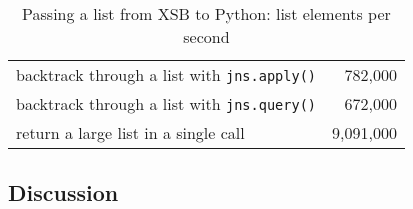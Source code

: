 \begin{table}[hbt] \label{table:janus-py-throughput}
  \begin{centering}
\begin{tabular}{lr} \hline
backtrack through a list with {\tt jns.apply()}          &   782,000\\
backtrack through a list with {\tt jns.query()}          &   672,000 \\ 
return a large list in a single call                 & 9,091,000\\\hline 
\end{tabular}
\caption{Passing a list from XSB to Python: list elements per second}
\end{centering}
\end{table}

%

\subsection{Discussion}

